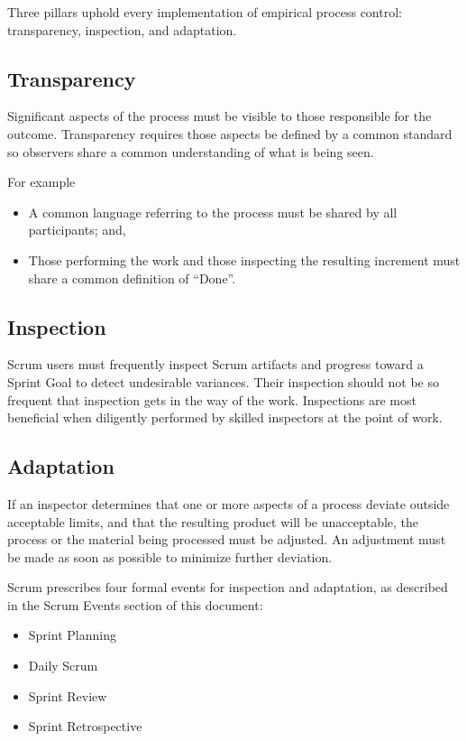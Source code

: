 Three pillars uphold every implementation of empirical process control: transparency,
inspection, and adaptation.

\subsection{Transparency}
Significant aspects of the process must be visible to those responsible for the outcome.
Transparency requires those aspects be defined by a common standard so observers share a
common understanding of what is being seen.

For example
\begin{itemize}
\item A common language referring to the process must be shared by all participants; and,
\item Those performing the work and those inspecting the resulting increment must share a
      common definition of ``Done''.
\end{itemize}

\subsection{Inspection}
Scrum users must frequently inspect Scrum artifacts and progress toward a Sprint Goal to detect
undesirable variances. Their inspection should not be so frequent that inspection gets in the way
of the work. Inspections are most beneficial when diligently performed by skilled inspectors at
the point of work.

\subsection{Adaptation}
If an inspector determines that one or more aspects of a process deviate outside acceptable
limits, and that the resulting product will be unacceptable, the process or the material being
processed must be adjusted. An adjustment must be made as soon as possible to minimize
further deviation.

Scrum prescribes four formal events for inspection and adaptation, as described in the Scrum
Events section of this document:
\begin{itemize}
\item Sprint Planning
\item Daily Scrum
\item Sprint Review
\item Sprint Retrospective
\end{itemize}

